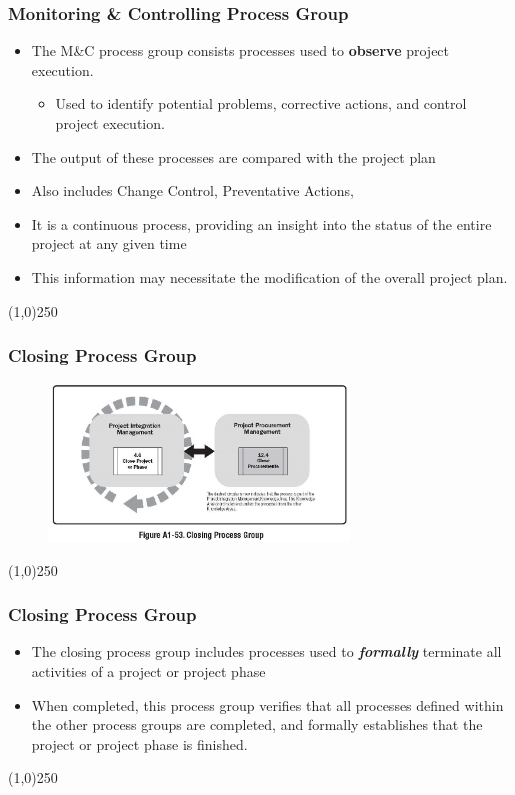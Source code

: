 \begin{frame}
\frametitle{Monitoring \& Controlling Process Group}
\begin{itemize}
	\item The M\&C process group consists processes used to \textbf{observe} project execution.
\begin{itemize}
	\item Used to identify potential problems, corrective actions, and control project execution.
\end{itemize}
	\item The output of these processes are compared with the project plan
	\item Also includes Change Control, Preventative Actions, 
	\item It is a continuous process, providing an insight into the status of the entire project at any given time
	\item This information may necessitate the modification of the overall project plan.
\end{itemize}
\end{frame}
\begin{center}\line(1,0){250}\end{center}



\begin{frame}
\frametitle{Closing Process Group}
 \begin{figure}
 	\centering
 		\includegraphics[width = 8cm]{images/FigA1-53.jpg}
 	\label{fig:A1-53}
 \end{figure}
\end{frame}
\begin{center}\line(1,0){250}\end{center}



\begin{frame}
\frametitle{Closing Process Group}
\begin{itemize}
	\item The closing process group includes processes used to \textbf{\textit{formally}} terminate all activities of a project or project phase
	\item When completed, this process group verifies that all processes defined within the other process groups are completed, and formally establishes that the project or project phase is finished.
\end{itemize}
\end{frame}
\begin{center}\line(1,0){250}\end{center}



